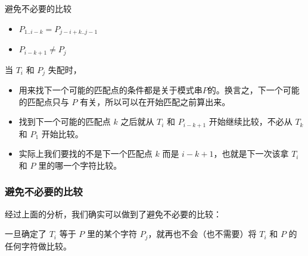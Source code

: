 \documentclass{ctexbeamer}
\begin{document}
\begin{frame}{避免不必要的比较}
  \begin{tcolorbox}[title=要点]
    \begin{itemize}
      \item $P_{1..i-k} = P_{j - i+k ..j - 1}$
      \item $P_{i - k + 1} \ne P_j$
      \end{itemize}
      \tcblower
      当 $T_i$ 和 $P_j$ 失配时，
    \begin{itemize}
      \item 用来找下一个可能的匹配点的条件都是关于模式串$P$的。换言之，下一个可能的匹配点只与 $P$ 有关，所以可以在开始匹配之前算出来。
      \item {\kaishu 找到下一个可能的匹配点 $k$ 之后就从 $T_i$ 和 $P_{i - k + 1}$ 开始继续比较，不必从 $T_k$ 和 $P_1$ 开始比较。}
      \item 实际上我们要找的不是下一个匹配点 $k$ 而是 $i-k+1$，也就是下一次该拿 $T_i$ 和 $P$ 里的哪一个字符比较。
      \end{itemize}
  \end{tcolorbox}


\end{frame}

\begin{frame}
  \frametitle{避免不必要的比较}

  经过上面的分析，我们确实可以做到了避免不必要的比较：

  \begin{tcolorbox}
    一旦确定了 $T_i$ 等于 $P$ 里的某个字符 $P_j$，就再也不会（也不需要）将 $T_i$ 和 $P$ 的任何字符做比较。
  \end{tcolorbox}

\end{frame}
\end{document}
